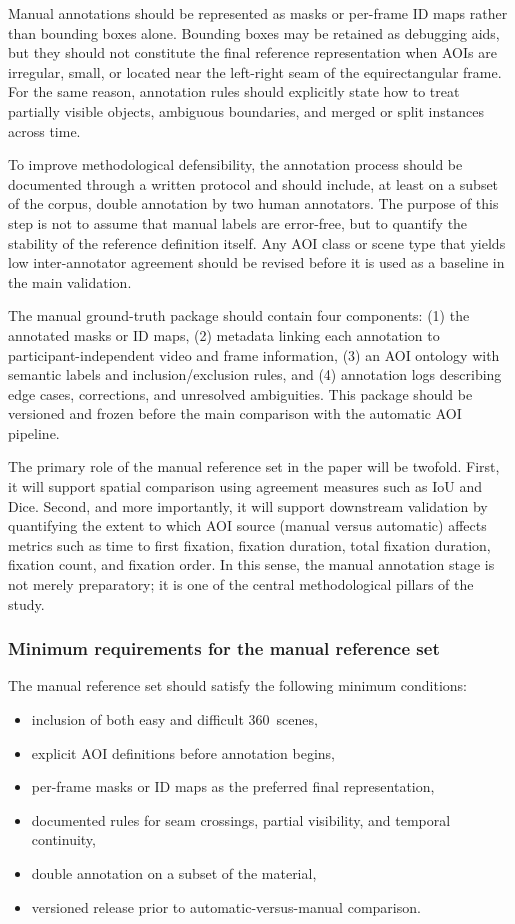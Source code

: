 \documentclass[11pt]{article}
\begin{document}
Manual annotations should be represented as masks or per-frame ID maps rather than bounding boxes alone. Bounding boxes may be retained as debugging aids, but they should not constitute the final reference representation when AOIs are irregular, small, or located near the left-right seam of the equirectangular frame. For the same reason, annotation rules should explicitly state how to treat partially visible objects, ambiguous boundaries, and merged or split instances across time.

To improve methodological defensibility, the annotation process should be documented through a written protocol and should include, at least on a subset of the corpus, double annotation by two human annotators. The purpose of this step is not to assume that manual labels are error-free, but to quantify the stability of the reference definition itself. Any AOI class or scene type that yields low inter-annotator agreement should be revised before it is used as a baseline in the main validation.

The manual ground-truth package should contain four components: (1) the annotated masks or ID maps, (2) metadata linking each annotation to participant-independent video and frame information, (3) an AOI ontology with semantic labels and inclusion/exclusion rules, and (4) annotation logs describing edge cases, corrections, and unresolved ambiguities. This package should be versioned and frozen before the main comparison with the automatic AOI pipeline.

The primary role of the manual reference set in the paper will be twofold. First, it will support spatial comparison using agreement measures such as IoU and Dice. Second, and more importantly, it will support downstream validation by quantifying the extent to which AOI source (manual versus automatic) affects metrics such as time to first fixation, fixation duration, total fixation duration, fixation count, and fixation order. In this sense, the manual annotation stage is not merely preparatory; it is one of the central methodological pillars of the study.

\subsubsection{Minimum requirements for the manual reference set}

The manual reference set should satisfy the following minimum conditions:

\begin{itemize}
    \item inclusion of both easy and difficult 360\textdegree\ scenes,
    \item explicit AOI definitions before annotation begins,
    \item per-frame masks or ID maps as the preferred final representation,
    \item documented rules for seam crossings, partial visibility, and temporal continuity,
    \item double annotation on a subset of the material,
    \item versioned release prior to automatic-versus-manual comparison.
\end{itemize}
\end{document}
